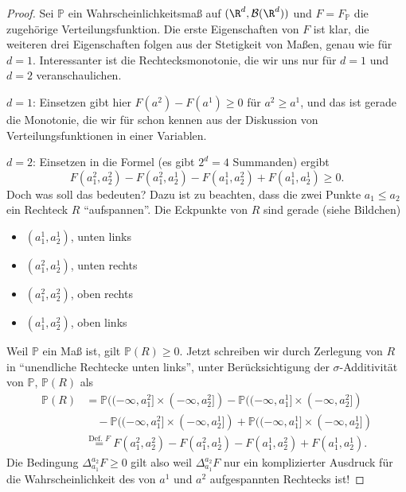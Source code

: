 \begin{proof}
	Sei $\mathbb P$ ein Wahrscheinlichkeitsma\ss{} auf $(\R^d, \mathcal B(\R^d))$ und $F=F_{\mathbb P}$ die zugeh\"orige Verteilungsfunktion. Die erste Eigenschaften von $F$ ist klar, die weiteren drei Eigenschaften folgen aus der Stetigkeit von Maßen, genau wie f\"ur $d=1$. Interessanter ist die Rechtecksmonotonie, die wir uns nur f\"ur $d=1$ und $d=2$ veranschaulichen. \smallskip
	
	$d = 1$: Einsetzen gibt hier $F(a^2) - F(a^1) \geq 0$ f\"ur $a^2\geq a^1$, und das ist gerade die Monotonie, die wir f\"ur schon kennen aus der Diskussion von Verteilungsfunktionen in einer Variablen.\smallskip
	
	$d = 2$: Einsetzen in die Formel (es gibt $2^d=4$ Summanden) ergibt $$F(a_1^2,a_2^2) - F(a_1^2,a_2^1) - F(a_1^1,a_2^2) +  F(a_1^1,a_2^1) \geq 0.$$ Doch was soll das bedeuten? Dazu ist zu beachten, dass die zwei Punkte $a_1\leq a_2$ ein Rechteck $R$ \enquote{aufspannen}. Die Eckpunkte von $R$ sind gerade (siehe Bildchen)
	\begin{itemize}
	\item $(a_1^1,a_2^1)$, unten links
	\item $(a_1^2,a_2^1)$, unten rechts
	\item $(a_1^2,a_2^2)$, oben rechts
	\item $(a^1_1,a_2^2)$, oben links
\end{itemize}	
	 Weil $\mathbb P$ ein Ma\ss{} ist, gilt $\mathbb P(R)\geq 0$. Jetzt schreiben wir durch Zerlegung von $R$ in \enquote{unendliche Rechtecke unten links}, unter Ber\"ucksichtigung der $\sigma$-Additivit\"at von $\mathbb P$, $\mathbb P(R)$ als 
	\begin{align*}
		\mathbb P(R)&=\mathbb P((-\infty,a_1^2]\times (-\infty, a_2^2])-\mathbb P((-\infty,a_1^1]\times (-\infty, a_2^2])\\
		&\quad-\mathbb P((-\infty,a_1^2]\times (-\infty, a_2^1])+\mathbb P((-\infty,a_1^1]\times (-\infty, a_2^1])\\
		&\overset{\text{Def. }F}{=}F(a_1^2,a_2^2) - F(a_1^2,a_2^1) - F(a_1^1,a_2^2) +  F(a_1^1,a_2^1).
	\end{align*}
	Die Bedingung $\Delta_{a_1}^{a_2}F\geq 0$ gilt also weil $\Delta_{a_1}^{a_2}F$ nur ein komplizierter Ausdruck f\"ur die Wahrscheinlichkeit des von $a^1$ und $a^2$ aufgespannten Rechtecks ist!	
\end{proof}